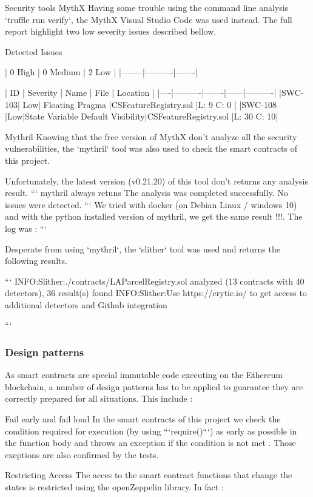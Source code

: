 \documentclass{isprs} %
\begin{document}
Security tools
MythX
Having some trouble using the command line analysis `truffle run verify`, the MythX Visual Studio Code was used instead.
The full report highlight two low severity issues described bellow. 

Detected Issues

| 0 High | 0 Medium | 2 Low |
|--------|----------|-------|

| ID | Severity |  Name | File | Location |
|----|----------|-------|------|----------|
|SWC-103| Low| Floating Pragma |CSFeatureRegistry.sol |L: 9 C: 0 |
|SWC-108 |Low|State Variable Default Visibility|CSFeatureRegistry.sol |L: 30 C: 10|


Mythril
Knowing that the free version of MythX don't analyze all the security vulnerabilities, the `mythril` tool was also used to check the smart contracts of this project.

Unfortunately, the latest version (v0.21.20) of this tool don't returns any analysis result.
```
mythril always retuns  The analysis was completed successfully. No issues were detected.
```
We tried with docker (on Debian Linux / windows 10) and with the python installed version of mythril, we get the same result !!!. The log was :
```

Desperate from using `mythril`, the `slither` tool was used and returns the following results.

```
INFO:Slither:./contracts/LAParcelRegistry.sol analyzed (13 contracts with 40 detectors), 36 result(s) found
INFO:Slither:Use https://crytic.io/ to get access to additional detectors and Github integration

```

\subsubsection{Design patterns}\label{sec:Design patterns}

As smart contracts are special immutable code executing on the Ethereum blockchain, a number of design patterns has to be applied to guarantee they are correctly prepared for all situations. This include :


Fail early and fail loud
In the smart contracts of this project we check the condition required for execution (by using  ```require()```) as early as possible in the function body and throws an exception if the condition is not met . Those exeptions are also confirmed by the tests. 

Restricting Access
The acces to the smart contract functions that change the states is restricted using the openZeppelin library. In fact :
\end{document}
